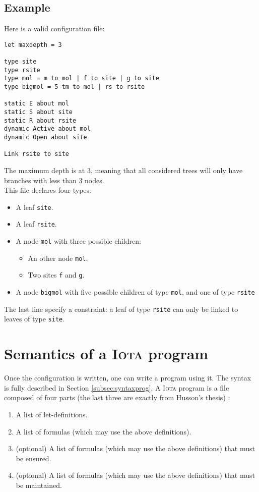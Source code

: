 \documentclass[10pt,a4paper]{article}
\newcommand\Iota{\textsc{Iota}}
\newcommand{\ocaml}{\texttt}
\begin{document}
\subsection{Example}
Here is a valid configuration file:
\begin{verbatim}
let maxdepth = 3

type site
type rsite
type mol = m to mol | f to site | g to site
type bigmol = 5 tm to mol | rs to rsite

static E about mol
static S about site
static R about rsite
dynamic Active about mol
dynamic Open about site

Link rsite to site
\end{verbatim}
The maximum depth is at 3, meaning that all considered trees will only have branches with less than 3 nodes.\\

This file declares four types:

\begin{itemize}
\item A leaf \ocaml{site}.
\item A leaf \ocaml{rsite}.
\item A node \ocaml{mol} with three possible children:
  \begin{itemize}
  \item An other node \ocaml{mol}.
  \item Two sites \ocaml{f} and \ocaml{g}.
  \end{itemize}
\item A node \ocaml{bigmol} with five possible children of type \ocaml{mol}, and one of type \ocaml{rsite}
\end{itemize}

The last line specify a constraint: a leaf of type \ocaml{rsite} can only be linked to leaves of type \ocaml{site}.

\section{Semantics of a \Iota{} program}
Once the configuration is written, one can write a program using it. The syntax is fully described in Section \ref{subsec:syntaxprog}. A \Iota{} program is a file composed of four parts (the last three are exactly from Husson's thesis) :

\begin{enumerate}
\item A list of let-definitions.
\item A list of formulas (which may use the above definitions).
\item (optional) A list of formulas (which may use the above definitions) that must be ensured.
\item (optional) A list of formulas (which may use the above definitions) that must be maintained.
\end{enumerate}
\end{document}
